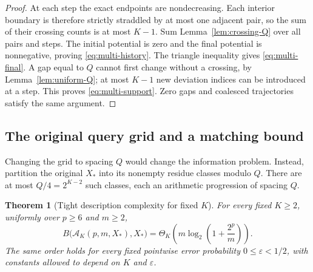 \documentclass[11pt,reqno]{amsart}
\newtheorem{theorem}{Theorem}[section]
\theoremstyle{definition}
\theoremstyle{remark}
\numberwithin{equation}{section}
\begin{document}
\begin{proof}
At each step the exact endpoints are nondecreasing. Each interior boundary
is therefore strictly straddled by at most one adjacent pair, so the sum of
their crossing counts is at most $K-1$. Sum
Lemma~\ref{lem:crossing-Q} over all pairs and steps. The initial potential
is zero and the final potential is nonnegative, proving
\eqref{eq:multi-history}. The triangle inequality gives
\eqref{eq:multi-final}. A gap equal to $Q$ cannot first change without a
crossing, by Lemma~\ref{lem:uniform-Q}; at most $K-1$ new deviation indices
can be introduced at a step. This proves \eqref{eq:multi-support}.
Zero gaps and coalesced trajectories satisfy the same argument.
\end{proof}

\subsection{The original query grid and a matching bound}

Changing the grid to spacing $Q$ would change the information problem.
Instead, partition the original $X_\ast$ into its nonempty residue classes
modulo $Q$. There are at most $Q/4=2^{K-2}$ such classes, each an arithmetic
progression of spacing $Q$.

\begin{samepage}
\begin{theorem}[Tight description complexity for fixed $K$]
\label{thm:fixed-K}
For every fixed $K\geq2$, uniformly over $p\geq6$ and $m\geq2$,
\begin{equation}
\label{eq:fixed-K-bound}
 B\bigl(\mathcal A_K(p,m,X_\ast),X_\ast\bigr)
 =\Theta_K\!\left(m\log_2\left(1+\frac{2^p}{m}\right)\right).
\end{equation}
The same order holds for every fixed pointwise error probability
$0\leq\varepsilon<1/2$, with constants allowed to depend on $K$ and
$\varepsilon$.
\end{theorem}
\end{samepage}
\end{document}
